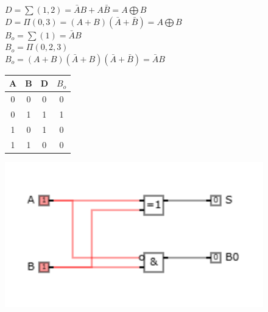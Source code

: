 \documentclass[12pt]{article}
\begin{document}
\begin{figure}[h!]
    \begin{minipage}{0.7\textwidth}
       $D=\sum(1,2)=\bar{A}B+A\bar{B}=A\bigoplus B$\\
       $D=\Pi(0,3)=(A+B)(\bar{A}+\bar{B})=A\bigoplus B$\\
       $B_{o}=\sum(1)=\bar{A}B$\\
       $B_{o}=\Pi(0,2,3)$\\
       $B_{o}=(A+B)(\bar{A}+B)(\bar{A}+\bar{B})=\bar{A}B$\\
    \end{minipage}
    \hfill
    \begin{minipage}{0.28\textwidth}
        \begin{tabular}{|c|c|c|c|}
            \hline
            A & B & D & $B_{o}$ \\ \hline
            0 & 0 & 0 & 0 \\ \hline
            0 & 1 & 1 & 1 \\ \hline
            1 & 0 & 1 & 0 \\ \hline
            1 & 1 & 0 & 0 \\ \hline
        \end{tabular}
    \end{minipage}
\end{figure}

\begin{figure}[h!]
    \begin{minipage}{0.7\textwidth}
        \includegraphics[scale=0.6]{Schema3.png}
    \end{minipage}
    \hfill
    \begin{minipage}{0.28\textwidth}
    \end{minipage}
\end{figure}
\end{document}
